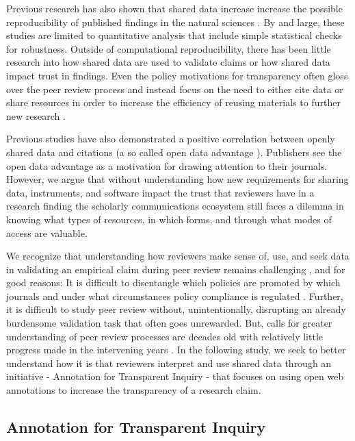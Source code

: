 \documentclass[sigchi]{acmart}
\begin{document}
Previous research has also shown that shared data increase increase the possible reproducibility of published findings in the natural sciences \cite{vanpaemel_are_2015, hardwicke_data_2018}. By and large, these studies are limited to quantitative analysis that include simple statistical checks for robustness. Outside of computational reproducibility, there has been little research into how shared data are used to validate claims or how shared data impact trust in findings. Even the policy motivations for transparency often gloss over the peer review process and instead focus on the need to either cite data or share resources in order to increase the efficiency of reusing materials to further new research \cite{parsons_data_2010}.    

Previous studies have also demonstrated a positive correlation between openly shared data and citations (a so called open data advantage \cite{piwowar_sharing_2007, christensen_study_2019}). Publishers see the open data advantage as a motivation for drawing attention to their journals. However, we argue that without understanding how new requirements for sharing data, instruments, and software impact the trust that reviewers have in a research finding the scholarly communications ecosystem still faces a dilemma in knowing what types of resources, in which forms, and through what modes of access are valuable. 

We recognize that understanding how reviewers make sense of, use, and seek data in validating an empirical claim during peer review remains challenging \cite{kratz_researcher_2015}, and for good reasons: It is difficult to disentangle which policies are promoted by which journals and under what circumstances policy compliance is regulated \cite{crosas_data_2018}. Further, it is difficult to  study peer review without, unintentionally, disrupting an already burdensome validation task that often goes unrewarded. But, calls for greater understanding of peer review processes are decades old with relatively little progress made in the intervening years \cite{bailar_journal_1985, lee_promote_2017}. In the following study, we seek to better understand how it is that reviewers interpret and use shared data through an initiative - Annotation for Transparent Inquiry - that focuses on using open web annotations to increase the transparency of a research claim.\\ 
\subsection{Annotation for Transparent Inquiry}
\end{document}

